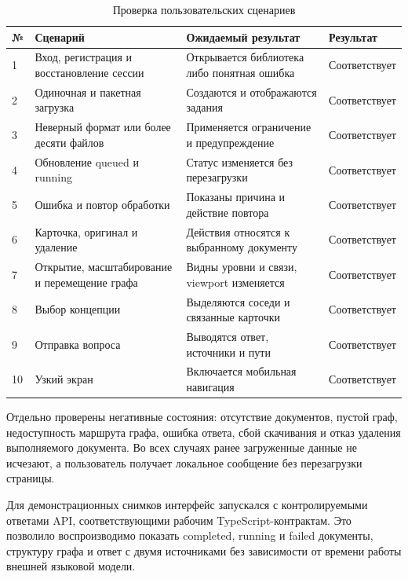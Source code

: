 \begin{table}[h!]
\caption{Проверка пользовательских сценариев}
\label{tab:frontend_tests}
\begin{tabularx}{\textwidth}{|p{}|X|X|p{}|}
\hline
\textbf{№} & \textbf{Сценарий} & \textbf{Ожидаемый результат} & \textbf{Результат} \\
\hline
1 & Вход, регистрация и восстановление сессии & Открывается библиотека либо понятная ошибка & Соответствует \\
\hline
2 & Одиночная и пакетная загрузка & Создаются и отображаются задания & Соответствует \\
\hline
3 & Неверный формат или более десяти файлов & Применяется ограничение и предупреждение & Соответствует \\
\hline
4 & Обновление queued и running & Статус изменяется без перезагрузки & Соответствует \\
\hline
5 & Ошибка и повтор обработки & Показаны причина и действие повтора & Соответствует \\
\hline
6 & Карточка, оригинал и удаление & Действия относятся к выбранному документу & Соответствует \\
\hline
7 & Открытие, масштабирование и перемещение графа & Видны уровни и связи, viewport изменяется & Соответствует \\
\hline
8 & Выбор концепции & Выделяются соседи и связанные карточки & Соответствует \\
\hline
9 & Отправка вопроса & Выводятся ответ, источники и пути & Соответствует \\
\hline
10 & Узкий экран & Включается мобильная навигация & Соответствует \\
\hline
\end{tabularx}
\end{table}

Отдельно проверены негативные состояния: отсутствие документов, пустой граф, недоступность маршрута графа, ошибка ответа, сбой скачивания и отказ удаления выполняемого документа. Во всех случаях ранее загруженные данные не исчезают, а пользователь получает локальное сообщение без перезагрузки страницы.

Для демонстрационных снимков интерфейс запускался с контролируемыми ответами API, соответствующими рабочим TypeScript-контрактам. Это позволило воспроизводимо показать completed, running и failed документы, структуру графа и ответ с двумя источниками без зависимости от времени работы внешней языковой модели.

